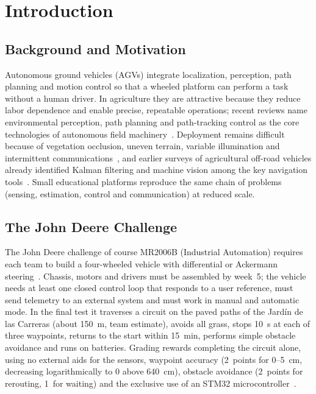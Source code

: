 \documentclass[conference]{IEEEtran}\newcommand{\haveieee}{}%
\begin{document}
\section{Introduction}

\subsection{Background and Motivation}
Autonomous ground vehicles (AGVs) integrate localization, perception, path planning and motion control so that a wheeled platform can perform a task without a human driver. In agriculture they are attractive because they reduce labor dependence and enable precise, repeatable operations; recent reviews name environmental perception, path planning and path-tracking control as the core technologies of autonomous field machinery~\cite{wu2025}. Deployment remains difficult because of vegetation occlusion, uneven terrain, variable illumination and intermittent communications~\cite{boros2026}, and earlier surveys of agricultural off-road vehicles already identified Kalman filtering and machine vision among the key navigation tools~\cite{mousazadeh2013}. Small educational platforms reproduce the same chain of problems (sensing, estimation, control and communication) at reduced scale.

\subsection{The John Deere Challenge}
The John Deere challenge of course MR2006B (Industrial Automation) requires each team to build a four-wheeled vehicle with differential or Ackermann steering~\cite{brief}. Chassis, motors and drivers must be assembled by week~5; the vehicle needs at least one closed control loop that responds to a user reference, must send telemetry to an external system and must work in manual and automatic mode. In the final test it traverses a circuit on the paved paths of the Jard\'in de las Carreras (about 150~m, team estimate), avoids all grass, stops 10~s at each of three waypoints, returns to the start within 15~min, performs simple obstacle avoidance and runs on batteries. Grading rewards completing the circuit alone, using no external aids for the sensors, waypoint accuracy (2~points for 0--5~cm, decreasing logarithmically to 0 above 640~cm), obstacle avoidance (2~points for rerouting, 1~for waiting) and the exclusive use of an STM32 microcontroller~\cite{brief}.
\end{document}
